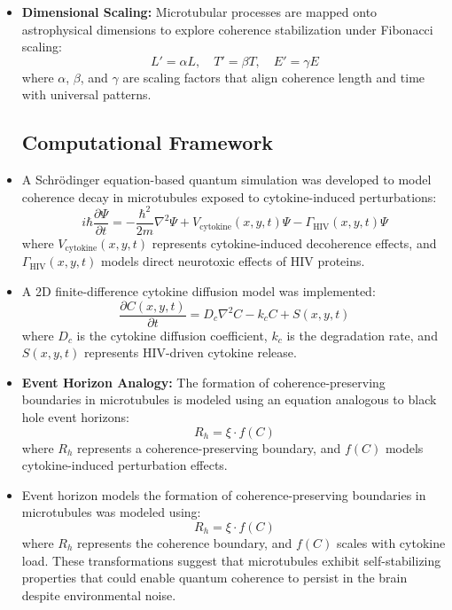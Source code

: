 \begin{itemize}
    \item \textbf{Dimensional Scaling:} Microtubular processes are mapped onto astrophysical dimensions to explore coherence stabilization under Fibonacci scaling:
    \begin{equation}
        L' = \alpha L, \quad T' = \beta T, \quad E' = \gamma E
        \label{eq:dim_scale}
    \end{equation}
    where $\alpha$, $\beta$, and $\gamma$ are scaling factors that align coherence length and time with universal patterns.
\subsection{Computational Framework}
\item A Schrödinger equation-based quantum simulation was developed to model coherence decay in microtubules exposed to cytokine-induced perturbations:
\begin{equation}
i\hbar \frac{\partial \Psi}{\partial t} = -\frac{\hbar^2}{2m} \nabla^2 \Psi + V_{\text{cytokine}}(x, y, t) \Psi - \Gamma_{\text{HIV}}(x, y, t) \Psi
\end{equation}
where \( V_{\text{cytokine}}(x, y, t) \) represents cytokine-induced decoherence effects, and \( \Gamma_{\text{HIV}}(x, y, t) \) models direct neurotoxic effects of HIV proteins.

\item A 2D finite-difference cytokine diffusion model was implemented:
\begin{equation}
\frac{\partial C(x, y, t)}{\partial t} = D_c \nabla^2 C - k_c C + S(x, y, t)
\end{equation}
where \( D_c \) is the cytokine diffusion coefficient, \( k_c \) is the degradation rate, and \( S(x, y, t) \) represents HIV-driven cytokine release.
\item \textbf{Event Horizon Analogy:} The formation of coherence-preserving boundaries in microtubules is modeled using an equation analogous to black hole event horizons:
    \begin{equation}
        R_h = \xi \cdot f(C)
        \label{eq:event_horizon}
    \end{equation}
    where $R_h$ represents a coherence-preserving boundary, and $f(C)$ models cytokine-induced perturbation effects.
\item Event horizon models the formation of coherence-preserving boundaries in microtubules was modeled using:
\begin{equation}
R_h = \xi \cdot f(C)
\end{equation}
where $R_h$ represents the coherence boundary, and $f(C)$ scales with cytokine load.
These transformations suggest that microtubules exhibit self-stabilizing properties that could enable quantum coherence to persist in the brain despite environmental noise.
\end{itemize}
